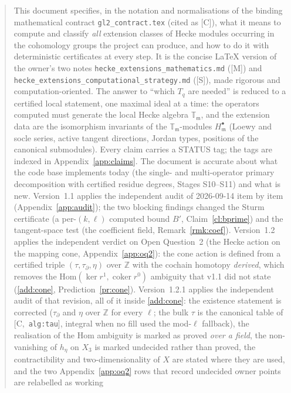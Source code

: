 \documentclass[11pt]{article}
\theoremstyle{remark}
\newcommand{\Z}{\mathbb{Z}}
\newcommand{\Hom}{\mathrm{Hom}}
\DeclareMathOperator{\coker}{coker}
\newcommand{\T}{\mathbb{T}}
\newcommand{\m}{\mathfrak{m}}
\newcommand{\HA}[1]{[C,~\texttt{#1}]}      %
\begin{document}
\begin{quote}
This document specifies, in the notation and normalisations of the binding mathematical
contract \texttt{gl2\_contract.tex} (cited as [C]), what it means to compute and classify \emph{all}
extension classes of Hecke modules occurring in the cohomology groups the project can produce,
and how to do it with deterministic certificates at every step. It is the concise LaTeX
version of the owner's two notes \texttt{hecke\_extensions\_\allowbreak mathematics.md} ([M]) and
\texttt{hecke\_extensions\_\allowbreak computational\_\allowbreak strategy.md} ([S]), made rigorous and
computation-oriented. The answer to ``which $T_q$ are needed'' is reduced to a certified
local statement, one maximal ideal at a time: the operators computed must generate the local
Hecke algebra $\T_\m$, and the extension data are the isomorphism invariants of the
$\T_\m$-modules $H^\bullet_\m$ (Loewy and socle series, active tangent directions, Jordan
types, positions of the canonical submodules). Every claim carries a STATUS tag; the tags
are indexed in Appendix~\ref{app:claims}. The document is accurate about what the code
base implements today (the single- and multi-operator primary decomposition with certified
residue degrees, Stages S10--S11) and what is new. Version~1.1 applies the independent audit
of 2026-09-14 item by item (Appendix~\ref{app:audit}); the two blocking findings changed the
Sturm certificate (a per-$(k,\ell)$ computed bound $B'$, Claim~\ref{cl:bprime}) and the
tangent-space test (the coefficient field, Remark~\ref{rmk:coef}). Version~1.2 applies the
independent verdict on Open Question~2 (the Hecke action on the mapping cone,
Appendix~\ref{app:oq2}): the cone action is defined from a certified triple
$(\tau,\tau_\partial,\eta)$ over $\Z$ with the cochain homotopy \emph{derived}, which removes the
$\Hom(\ker r^1,\coker r^0)$ ambiguity that v1.1 did not state (\ref{add:cone}, Prediction~\ref{pr:cone}).
Version~1.2.1 applies the independent audit of that revision, all of it inside \ref{add:cone}: the
existence statement is corrected ($\tau_\partial$ and $\eta$ over $\Z$ for every $\ell$; the bulk
$\tau$ is the canonical table of \HA{alg:tau}, integral when no fill used the mod-$\ell$ fallback),
the realisation of the $\Hom$ ambiguity is marked as proved \emph{over a field}, the non-vanishing
of $h_\eta$ on $X_3$ is marked undecided rather than proved, the contractibility and
two-dimensionality of $X$ are stated where they are used, and the two
Appendix~\ref{app:oq2} rows that record undecided owner points are relabelled as working

\end{quote}
\end{document}
